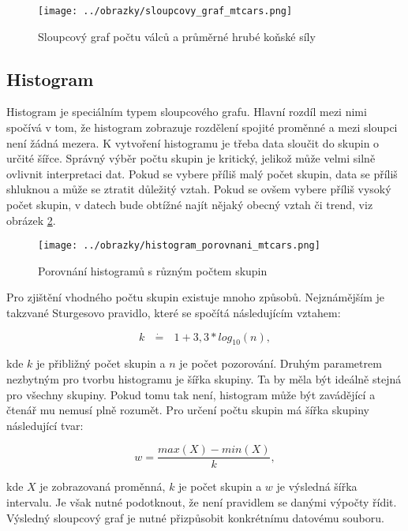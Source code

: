 \begin{figure}[H]
    \centering
    \texttt{[image: ../obrazky/sloupcovy\_graf\_mtcars.png]}
    \caption{Sloupcový graf počtu válců a průměrné hrubé koňské síly} 
    \label{fig:sloupcovy_graf_mtcars}
\end{figure}

\subsection{Histogram}

Histogram je speciálním typem sloupcového grafu. Hlavní rozdíl mezi nimi spočívá v tom, že histogram zobrazuje rozdělení spojité proměnné a mezi sloupci není žádná mezera.
K vytvoření histogramu je třeba data sloučit do skupin o určité šířce. Správný výběr počtu skupin je kritický, jelikož může velmi silně ovlivnit interpretaci dat. Pokud
se vybere příliš malý počet skupin, data se příliš shluknou a může se ztratit důležitý vztah. Pokud se ovšem vybere příliš vysoký počet skupin, v datech bude obtížné najít nějaký
obecný vztah či trend, viz obrázek \ref{fig:histogram_porovnani_mtcars}.

\begin{figure}[H]
    \centering
    \texttt{[image: ../obrazky/histogram\_porovnani\_mtcars.png]}
    \caption{Porovnání histogramů s různým počtem skupin} 
    \label{fig:histogram_porovnani_mtcars}
\end{figure}

Pro zjištění vhodného počtu skupin existuje mnoho způsobů. Nejznámějším je takzvané Sturgesovo pravidlo, které se spočítá následujícím vztahem:

\begin{equation}
    \label{eq:sturgesovo_pravidlo}
    k \text{ } \dot{\mathbf{=}} \text{ } 1 + 3,3 * log_{10}(n),
\end{equation}

kde $k$ je přibližný počet skupin a $n$ je počet pozorování. Druhým parametrem nezbytným pro tvorbu histogramu je šířka skupiny.
Ta by měla být ideálně stejná pro všechny skupiny. Pokud tomu tak není, histogram může být zavádějící a čtenář mu nemusí plně rozumět.
Pro určení počtu skupin má šířka skupiny následující tvar:

\begin{equation}
    w = \frac{max(X) - min(X)}{k},
\end{equation}

kde $X$ je zobrazovaná proměnná, $k$ je počet skupin a $w$ je výsledná šířka intervalu. 
Je však nutné podotknout, že není pravidlem se danými výpočty řídit. Výsledný
sloupcový graf je nutné přizpůsobit konkrétnímu datovému souboru.

